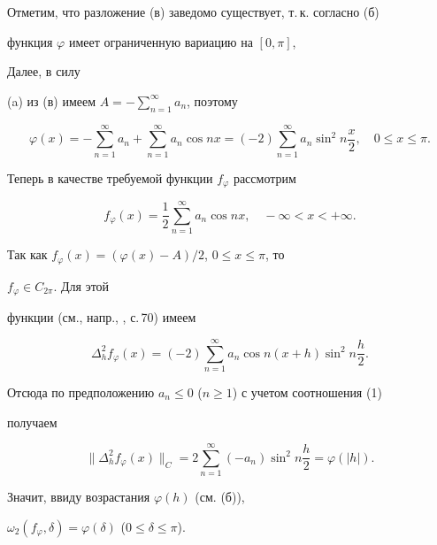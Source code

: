 \begin{pf} 


Отметим, что разложение (в) заведомо существует, т.\,к. согласно (б) 


функция $\varphi$ имеет ограниченную вариацию на $[0,\pi]$, 


Далее, в силу 


(a) из (в) имеем $A=-\sum\limits^\infty_{n=1}a_n$, поэтому 


\begin{equation} 


\varphi(x)=-\sum^\infty_{n=1}a_n+\sum^\infty_{n=1} 


a_n\cos nx=(-2)\sum^\infty_{n=1}a_n \sin^2n\frac{x}{2}, 


\quad 0\le x\le\pi. 


\end{equation} 


Теперь в качестве требуемой функции $f_\varphi$ рассмотрим 


\begin{equation} 


f_\varphi(x)=\frac{1}{2}\sum^\infty_{n=1}a_n\cos nx, 


\quad -\infty<x<+\infty. 


\end{equation} 


Так как $f_\varphi(x)=(\varphi(x)-A)/2$, $0\le x\le\pi$, то 


$f_\varphi\in C_{2\pi}$. Для этой 


функции (см., напр., \cite{2}, с.\,70) имеем 


$$ 


\Delta^2_h f_\varphi(x)=(-2)\sum^\infty_{n=1}a_n 


\cos n(x+h)\sin^2n\frac{h}{2}. 


$$ 


Отсюда по предположению $a_n\le 0$ ($n\ge 1$) с учетом соотношения (1) 


получаем 


\begin{equation} 


\|\Delta^2_h f_\varphi(x)\|_C=2\sum^\infty_{n=1} 


(-a_n)\sin^2n\frac{h}{2}=\varphi(|h|). 


\end{equation} 


Значит, ввиду возрастания $\varphi(h)$ (см. (б)), 


$\omega_2(f_\varphi,\delta)=\varphi(\delta)$ ($0\le\delta\le\pi$). 


\end{pf} 


